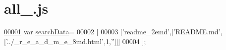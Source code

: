 \hypertarget{all__4_8js_source}{\section{all\+\_.\+js}
\label{all__4_8js_source}
}

\begin{DoxyCode}
\hypertarget{all__4_8js_source_l00001}{}\hyperlink{all__4_8js_ad01a7523f103d6242ef9b0451861231e}{00001} var \hyperlink{all__4_8js_ad01a7523f103d6242ef9b0451861231e}{searchData}=
00002 [
00003   [\textcolor{stringliteral}{'readme\_2emd'},[\textcolor{stringliteral}{'README.md'},[\textcolor{stringliteral}{'../\_r\_e\_a\_d\_m\_e\_8md.html'},1,\textcolor{stringliteral}{''}]]]
00004 ];
\end{DoxyCode}
